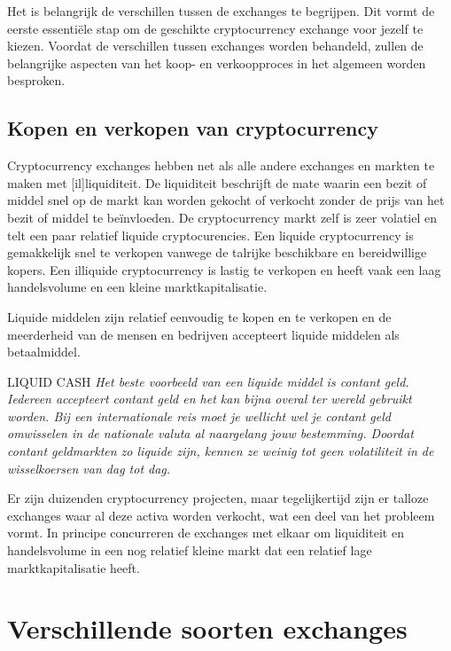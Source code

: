 Het is belangrijk de verschillen tussen de exchanges te begrijpen. Dit vormt de eerste essenti{\"e}le stap om de geschikte cryptocurrency exchange voor jezelf te kiezen. Voordat de verschillen tussen exchanges worden behandeld, zullen de belangrijke aspecten van het koop- en verkoopproces in het algemeen worden besproken.


\subsection*{Kopen en verkopen van cryptocurrency}
Cryptocurrency exchanges hebben net als alle andere exchanges en markten te maken met [il]liquiditeit. De liquiditeit beschrijft de mate waarin een bezit of middel snel op de markt kan worden gekocht of verkocht zonder de prijs van het bezit of middel te be{\"i}nvloeden. De cryptocurrency markt zelf is zeer volatiel en telt een paar relatief liquide cryptocurencies. Een liquide cryptocurrency is gemakkelijk snel te verkopen vanwege de talrijke beschikbare en bereidwillige kopers. Een illiquide cryptocurrency is lastig te verkopen en heeft vaak een laag handelsvolume en een kleine marktkapitalisatie.\medskip 

 Liquide middelen zijn relatief eenvoudig te kopen en te verkopen en de meerderheid van de mensen en bedrijven accepteert liquide middelen als betaalmiddel.
 
    \bigskip
    \begin{cryptobox}{LIQUID CASH}
        \textit{Het beste voorbeeld van een liquide middel is contant geld. Iedereen accepteert contant geld en het kan bijna overal ter wereld gebruikt worden. Bij een internationale reis moet je wellicht wel je contant geld omwisselen in de nationale valuta al naargelang jouw bestemming. Doordat contant geldmarkten zo liquide zijn, kennen ze weinig tot geen volatiliteit in de wisselkoersen van dag tot dag.}
    \end{cryptobox}
    \medskip
    
Er zijn duizenden cryptocurrency projecten, maar tegelijkertijd zijn er talloze exchanges waar al deze activa worden verkocht, wat een deel van het probleem vormt. In principe concurreren de exchanges met elkaar om liquiditeit en handelsvolume in een nog relatief kleine markt dat een relatief lage marktkapitalisatie heeft.

\section{Verschillende soorten exchanges}
\label{sec:exchangetypes}

